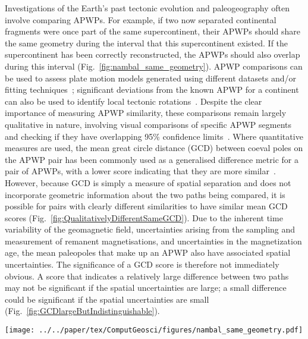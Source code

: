Investigations of the Earth's past tectonic evolution and paleogeography often
involve comparing APWPs. For example, if two now separated continental fragments
were once part of the same supercontinent, their APWPs should share the same
geometry during the interval that this supercontinent existed. If the
supercontinent has been correctly reconstructed, the APWPs should also overlap
during this interval (Fig.~\ref{fig:nambal_same_geometry}). APWP comparisons can
be used to assess plate motion models generated using different datasets and/or
fitting techniques~\cite[for example]{B02,B07,S07,T08,D11}; significant deviations
from the known APWP for a continent can also be used to identify local tectonic
rotations~\cite[for example]{G10,Ch13}. Despite the clear importance of measuring
APWP similarity, these comparisons remain largely qualitative in nature,
involving visual comparisons of specific APWP segments and checking if they have
overlapping 95\% confidence limits~\cite[for example]{B02,B07,G10,D11}. Where
quantitative measures are used, the mean great circle distance (GCD) between
coeval poles on the APWP pair has been commonly used as a generalised difference
metric for a pair of APWPs, with a lower score indicating that they are more
similar~\cite[for example]{S07,T08}. However, because GCD is simply a measure of
spatial separation and does not incorporate geometric information about the two
paths being compared, it is possible for pairs with clearly different
similarities to have similar mean GCD scores
(Fig.~\ref{fig:QualitativelyDifferentSameGCD}). Due to the inherent time
variability of the geomagnetic field, uncertainties arising from the sampling
and measurement of remanent magnetisations, and uncertainties in the
magnetization age, the mean paleopoles that make up an APWP also have associated
spatial uncertainties. The significance of a GCD score is therefore not
immediately obvious. A score that indicates a relatively large difference
between two paths may not be significant if the spatial uncertainties are large;
a small difference could be significant if the spatial uncertainties are small
(Fig.~\ref{fig:GCDlargeButIndistinguishable}).


\begin{figure*}[tbp]
\centering
\texttt{[image: ../../paper/tex/ComputGeosci/figures/nambal\_same\_geometry.pdf]}
\caption[Parts of APWPs of supercontinent fragments share the same
geometry]{(a) The APWPs for North America (black) and Baltica (grey) are
spatially distinct, but their Late Paleozoic\textendash{}Early Mesozoic sections
are geometrically similar due to them both being part of the supercontinent
Pangaea. (b) Reversing the opening of the Atlantic Ocean by rotation around a
reconstruction pole (blue star) results in the overlap of these two APWPs
between 390 million years ago (Ma) and 220 Ma, validating the proposed
paleogeography. The effects of this rotation on Baltica and its APWP (BAL) are
illustrated by the motion of the circle marker (before: blank center; after:
dark center), respectively. General Perspective projection. APWPs and rotation
parameters from~\cite{To16}.}\label{fig:nambal_same_geometry}
\end{figure*}

